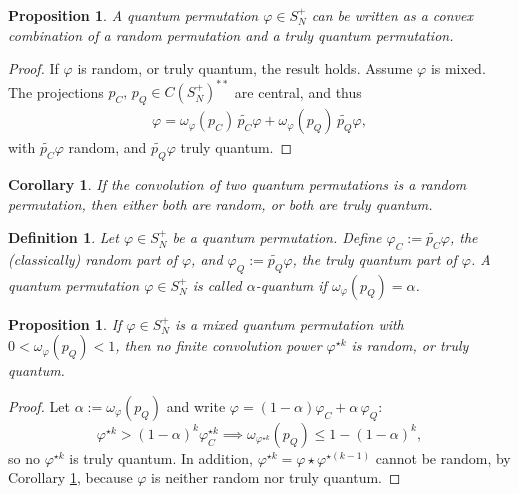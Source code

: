 \documentclass[12pt]{amsart}
\newtheorem{definition}[theorem]{Definition}
\newtheorem{proposition}[theorem]{Proposition}
\newtheorem{corollary}[theorem]{Corollary}
\theoremstyle{remark}
\theoremstyle{remark}
\begin{document}
\begin{proposition}
A quantum permutation $\varphi\in S_N^+$ can be written as a convex combination of a random permutation and a truly quantum permutation.
\end{proposition}
\begin{proof}
If $\varphi$ is random, or truly quantum, the result holds. Assume $\varphi$ is mixed. The projections $p_C,\,p_Q\in C(S_N^+)^{**}$ are central, and thus
\begin{align*}
  \varphi =\omega_\varphi(p_C)\,\widetilde{p_C}\varphi+\omega_\varphi(p_Q)\,\widetilde{p_Q}\varphi,
\end{align*}
with $\widetilde{p_C}\varphi$ random, and $\widetilde{p_Q}\varphi$  truly quantum.
\end{proof}
\begin{corollary}\label{makeran}
  If the convolution of two quantum permutations is a random permutation, then either both are random, or both are truly quantum.
\end{corollary}
\begin{definition}
Let $\varphi\in S_N^+$ be a quantum permutation. Define $\varphi_C:=\widetilde{p_C}\varphi$, the (classically) random part of $\varphi$, and $\varphi_Q:=\widetilde{p_Q}\varphi$, the truly quantum part of $\varphi$. A quantum permutation $\varphi\in S_N^+$ is called $\alpha$-quantum if $\omega_\varphi(p_Q)=\alpha$.
\end{definition}

\begin{proposition}
If $\varphi\in S_N^+$ is a mixed quantum permutation with $0<\omega_\varphi(p_Q)<1$, then no finite convolution power $\varphi^{\star k}$ is random, or truly quantum.
\end{proposition}
\begin{proof}
Let $\alpha:=\omega_\varphi(p_Q)$ and write $\varphi=(1-\alpha)\varphi_C+\alpha\,\varphi_Q$:
$$\varphi^{\star k}>(1-\alpha)^k\varphi_C^{\star k}\implies \omega_{\varphi^{\star k}}(p_Q)\leq  1-(1-\alpha)^k,$$
so no $\varphi^{\star k}$ is truly quantum. In addition, $\varphi^{\star k}=\varphi\star \varphi^{\star(k-1)}$ cannot be random, by Corollary \ref{makeran}, because $\varphi$ is neither random nor truly quantum.

\end{proof}
\end{document}
